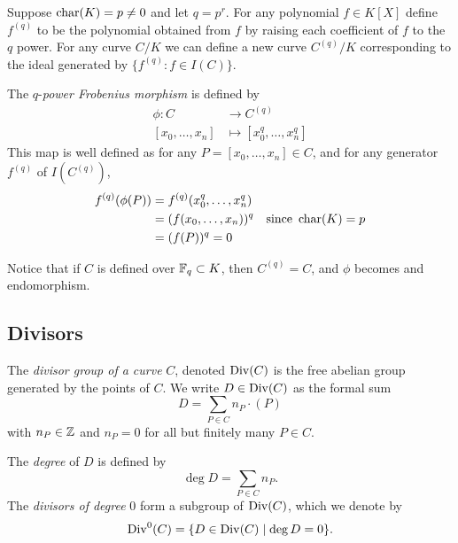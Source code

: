 \begin{definition}
	Suppose $\operatorname{char}(K) = p \neq 0$ and let $q = p^r$.
	For any polynomial $f \in K[X]$ define $f^{(q)}$ to be the polynomial
	obtained from $f$ by raising each coefficient of 
	$f$ to the $q$ power.
	For any curve $C/K$ we can define a new curve $C^{(q)}/K$ corresponding
	to the ideal generated by $\{f^{(q)}: f \in I(C)\}$.	

	The $q$-\emph{power Frobenius morphism} is defined by
	\begin{align*}
		\phi: C &\to C^{(q)}\\
		[x_0, \dots, x_n] &\mapsto [x_0^q, \dots, x_n^q]
	\end{align*}
	This map is well defined as for any $P = [x_0, \dots, x_n] \in C$, and
	for any generator $f^{(q)}$ of $I(C^{(q)})$,
	\begin{align*}
		f^{(q)}(\phi(P)) &= f^{(q)}(x_0^q, \dots, x_n^q)\\
		&= (f(x_0, \dots, x_n))^q&\textrm{since }\operatorname{char}(K) = p\\
		&= (f(P))^q = 0
	\end{align*}
	
	Notice that if
	$C$ is defined over $\mathbb{F}_q \subset K$, then $C^{(q)} = C$,
	and $\phi$ becomes and endomorphism.
\end{definition}

\subsection{Divisors}

\begin{definition}
	The \emph{divisor group of a curve} $C$, denoted $\operatorname{Div}(C)$ is the free
	abelian group generated by the points of $C$. We write $D \in \operatorname{Div}(C)$ as
	the formal sum
	\begin{equation*}
		D = \sum_{P \in C} n_P\cdot(P)
	\end{equation*}
	with $n_P \in \mathbb{Z}$ and $n_P = 0$ for all but finitely many $P \in C$.

	The \emph{degree} of $D$ is defined by
	\begin{equation*}
		\deg D = \sum_{P \in C} n_P.
	\end{equation*}
	The \emph{divisors of degree} 0 form a subgroup of $\operatorname{Div}(C)$, which we denote
	by
	\begin{equation*}
		\operatorname{Div}^0(C) = \{D \in \operatorname{Div}(C) \mid \deg D = 0\}.
	\end{equation*}
\end{definition}

